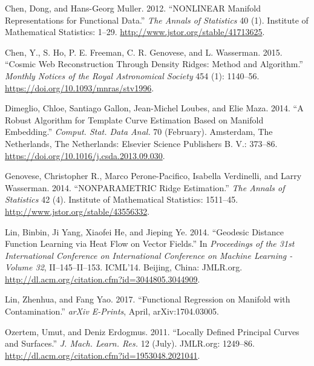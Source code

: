\documentclass[]{article}
\begin{document}
\hypertarget{refs}{}
\leavevmode\hypertarget{ref-ChenMuller2012}{}%
Chen, Dong, and Hans-Georg Muller. 2012. ``NONLINEAR Manifold
Representations for Functional Data.'' \emph{The Annals of Statistics}
40 (1). Institute of Mathematical Statistics: 1--29.
\url{http://www.jstor.org/stable/41713625}.

\leavevmode\hypertarget{ref-ChenHo2015}{}%
Chen, Y., S. Ho, P. E. Freeman, C. R. Genovese, and L. Wasserman. 2015.
``Cosmic Web Reconstruction Through Density Ridges: Method and
Algorithm.'' \emph{Monthly Notices of the Royal Astronomical Society}
454 (1): 1140--56. \url{https://doi.org/10.1093/mnras/stv1996}.

\leavevmode\hypertarget{ref-Dimeglio2014}{}%
Dimeglio, Chloe, Santiago Gallon, Jean-Michel Loubes, and Elie Maza.
2014. ``A Robust Algorithm for Template Curve Estimation Based on
Manifold Embedding.'' \emph{Comput. Stat. Data Anal.} 70 (February).
Amsterdam, The Netherlands, The Netherlands: Elsevier Science Publishers
B. V.: 373--86. \url{https://doi.org/10.1016/j.csda.2013.09.030}.

\leavevmode\hypertarget{ref-Genovese2014}{}%
Genovese, Christopher R., Marco Perone-Pacifico, Isabella Verdinelli,
and Larry Wasserman. 2014. ``NONPARAMETRIC Ridge Estimation.'' \emph{The
Annals of Statistics} 42 (4). Institute of Mathematical Statistics:
1511--45. \url{http://www.jstor.org/stable/43556332}.

\leavevmode\hypertarget{ref-Lin2014}{}%
Lin, Binbin, Ji Yang, Xiaofei He, and Jieping Ye. 2014. ``Geodesic
Distance Function Learning via Heat Flow on Vector Fields.'' In
\emph{Proceedings of the 31st International Conference on International
Conference on Machine Learning - Volume 32}, II--145--II--153. ICML'14.
Beijing, China: JMLR.org.
\url{http://dl.acm.org/citation.cfm?id=3044805.3044909}.

\leavevmode\hypertarget{ref-LinYao2017}{}%
Lin, Zhenhua, and Fang Yao. 2017. ``Functional Regression on Manifold
with Contamination.'' \emph{arXiv E-Prints}, April, arXiv:1704.03005.

\leavevmode\hypertarget{ref-Ozertem2011}{}%
Ozertem, Umut, and Deniz Erdogmus. 2011. ``Locally Defined Principal
Curves and Surfaces.'' \emph{J. Mach. Learn. Res.} 12 (July). JMLR.org:
1249--86. \url{http://dl.acm.org/citation.cfm?id=1953048.2021041}.
\end{document}
